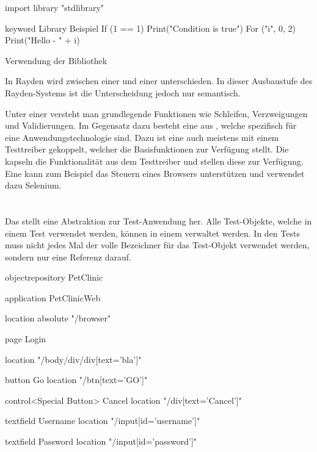 \begin{program}
\begin{JavaCode}
import library "stdlibrary"

keyword Library Beispiel {
	If (1 == 1){
		Print("Condition is true")
	}
	For ("i", 0, 2){
		Print("Hello - " + i)
	}
}
\end{JavaCode}
\caption{Verwendung der  Bibliothek}
\label{prog:libraryUsage}
\end{program}

\SuperPar
In Rayden wird zwischen einer  und einer  unterschieden. In dieser Ausbaustufe des Rayden-Systems ist die Unterscheidung jedoch nur semantisch. 

\SuperPar
Unter einer  versteht man grundlegende Funktionen wie Schleifen, Verzweigungen und Validierungen. Im Gegensatz dazu besteht eine  aus , welche spezifisch für eine Anwendungstechnologie sind. Dazu ist eine  auch meistens mit einem Testtreiber gekoppelt, welcher die Basisfunktionen zur Verfügung stellt. Die  kapseln die Funktionalität aus dem Testtreiber und stellen diese zur Verfügung. Eine  kann zum Beispiel das Steuern eines Browsers unterstützen und verwendet dazu Selenium. 


\section{}

Das  stellt eine Abstraktion zur Test-Anwendung her. Alle Test-Objekte, welche in einem Test verwendet werden, können in einem  verwaltet werden. In den Tests muss nicht jedes Mal der volle Bezeichner für das Test-Objekt verwendet werden, sondern nur eine Referenz darauf. 

\begin{program}
\begin{JavaCode}

objectrepository PetClinic {

	application PetClinicWeb {
		location absolute "/browser"
		
		page Login {
			location "/body/div/div[text='bla']"
			
			button Go {
				location "/btn[text='GO']"
			}
			
			control<Special Button> Cancel {
				location "/div[text='Cancel']"
			}
		
			textfield Username {
				location  "/input[id='username']"
			}
			
			textfield Password {
				location  "/input[id='password']"
			}			
		} 
	}
}
\end{JavaCode}
\caption{}
\label{prog:or}
\end{program}

